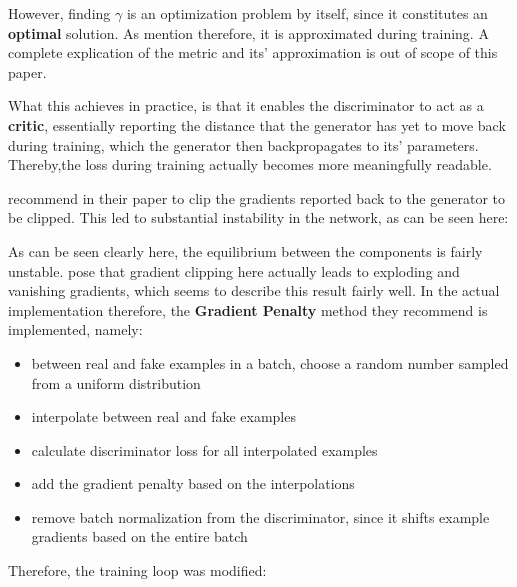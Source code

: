 However, finding $\gamma$ is an optimization problem by itself, since it constitutes an \textbf{optimal} solution. As \cite{arjovsky2017wasserstein} mention therefore, it is approximated during training.
A complete explication of the metric and its' approximation is out of scope of this paper.

What this achieves in practice, is that it enables the discriminator to act as a \textbf{critic}, essentially reporting the distance that the generator has yet to move back during training, 
which the generator then backpropagates to its' parameters. Thereby,the loss during training actually becomes more meaningfully readable.

\pagebreak

\cite{arjovsky2017wasserstein} recommend in their paper to clip the gradients reported back to the generator to be clipped. This led to substantial instability in the network, as can be seen here:


As can be seen clearly here, the equilibrium between the components is fairly unstable.
\cite{gulrajani2017improved} pose that gradient clipping here actually leads to exploding and vanishing gradients, which seems to describe this result fairly well. 
In the actual implementation therefore, the \textbf{Gradient Penalty} method they recommend is implemented, namely:

\begin{itemize}
	\item between real and fake examples in a batch, choose a random number sampled from a uniform distribution
	\item interpolate between real and fake examples
	\item calculate discriminator loss for all interpolated examples
	\item add the gradient penalty based on the interpolations
	\item remove batch normalization from the discriminator, since it shifts example gradients based on the entire batch
\end{itemize}

\pagebreak

Therefore, the training loop was modified:



